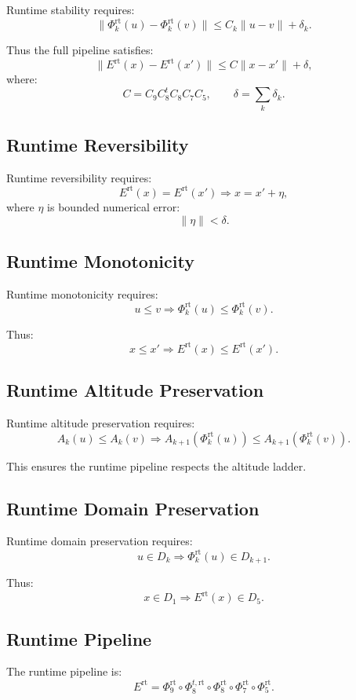 Runtime stability requires:
\[
\| \Phi_k^{\text{rt}}(u) - \Phi_k^{\text{rt}}(v) \|
\le
C_k \| u - v \| + \delta_k.
\]

Thus the full pipeline satisfies:
\[
\| E^{\text{rt}}(x) - E^{\text{rt}}(x') \|
\le
C \| x - x' \| + \delta,
\]
where:
\[
C = C_9 C_8^t C_8 C_7 C_5,
\qquad
\delta = \sum_k \delta_k.
\]

\subsection{Runtime Reversibility}

Runtime reversibility requires:
\[
E^{\text{rt}}(x) = E^{\text{rt}}(x')
\Rightarrow
x = x' + \eta,
\]
where $\eta$ is bounded numerical error:
\[
\| \eta \| < \delta.
\]

\subsection{Runtime Monotonicity}

Runtime monotonicity requires:
\[
u \le v \Rightarrow \Phi_k^{\text{rt}}(u) \le \Phi_k^{\text{rt}}(v).
\]

Thus:
\[
x \le x' \Rightarrow E^{\text{rt}}(x) \le E^{\text{rt}}(x').
\]

\subsection{Runtime Altitude Preservation}

Runtime altitude preservation requires:
\[
A_k(u) \le A_k(v)
\Rightarrow
A_{k+1}(\Phi_k^{\text{rt}}(u))
\le
A_{k+1}(\Phi_k^{\text{rt}}(v)).
\]

This ensures the runtime pipeline respects the altitude ladder.

\subsection{Runtime Domain Preservation}

Runtime domain preservation requires:
\[
u \in D_k \Rightarrow \Phi_k^{\text{rt}}(u) \in D_{k+1}.
\]

Thus:
\[
x \in D_1 \Rightarrow E^{\text{rt}}(x) \in D_5.
\]

\subsection{Runtime Pipeline}

The runtime pipeline is:
\[
E^{\text{rt}} = 
\Phi_9^{\text{rt}}
\circ
\Phi_8^{t,\text{rt}}
\circ
\Phi_8^{\text{rt}}
\circ
\Phi_7^{\text{rt}}
\circ
\Phi_5^{\text{rt}}.
\]

